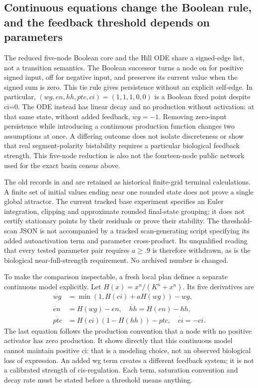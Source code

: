 \subsection{Continuous equations change the Boolean rule, and the feedback threshold depends on parameters}
The reduced five-node Boolean core and the Hill ODE share a signed-edge list, not a transition semantics. The Boolean successor turns a node on for positive signed input, off for negative input, and preserves its current value when the signed sum is zero. This tie rule gives persistence without an explicit self-edge. In particular, $(wg,en,hh,ptc,ci)=(1,1,1,0,0)$ is a Boolean fixed point despite ci=0. The ODE instead has linear decay and no production without activation: at that same state, without added feedback, $\dot{wg}=-1$. Removing zero-input persistence while introducing a continuous production function changes two assumptions at once. A differing outcome does not isolate discreteness or show that real segment-polarity bistability requires a particular biological feedback strength. This five-node reduction is also not the fourteen-node public network used for the exact basin census above.

The old records in  and  are retained as historical finite-grid terminal calculations. A finite set of initial values ending near one rounded state does not prove a single global attractor. The current tracked base experiment specifies an Euler integration, clipping and approximate rounded final-state grouping; it does not certify stationary points by their residuals or prove their stability. The threshold-scan JSON is not accompanied by a tracked scan-generating script specifying its added autoactivation term and parameter cross-product. Its unqualified reading that every tested parameter pair requires $a\geq.9$ is therefore withdrawn, as is the biological near-full-strength requirement. No archived number is changed.

To make the comparison inspectable, a fresh local plan defines a separate continuous model explicitly. Let $H(x)=x^n/(K^n+x^n)$. Its five derivatives are
\begin{align*}
\dot{wg}&=\min(1,H(ci)+aH(wg))-wg,\\
\dot{en}&=H(wg)-en,\quad \dot{hh}=H(en)-hh,\\
\dot{ptc}&=H(ci)(1-H(hh))-ptc,\quad \dot{ci}=-ci.
\end{align*}
The last equation follows the production convention that a node with no positive activator has zero production. It shows directly that this continuous model cannot maintain positive ci: that is a modeling choice, not an observed biological loss of expression. An added wg term creates a different feedback system; it is not a calibrated strength of cis-regulation. Each term, saturation convention and decay rate must be stated before a threshold means anything.


